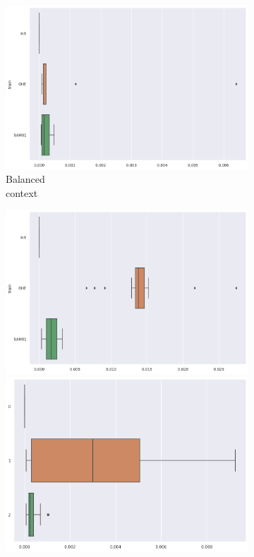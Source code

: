 \documentclass{article}
\theoremstyle{definition}
\begin{document}
\begin{figure}[ht]
\begin{subfigure}[b]{0.15\textwidth}
         \quad
         \includegraphics[width=\textwidth]{imgs/Illu/3000Epochs/Bal/Boxplots_MSEM.png}   
         \caption{Balanced \\ context}
         \label{MSEM_Bal_X}
     \end{subfigure}
     \begin{subfigure}[b]{0.15\textwidth}
         \centering
         \includegraphics[width=\textwidth]{imgs/Illu/1000Epochs/Majo/Boxplots_MSEM.png}
         \quad
         \includegraphics[width=\textwidth]{imgs/Illu/2000Epochs/Majo/Boxplots_MSEM.png}

\end{subfigure}
\end{figure}
\end{document}
